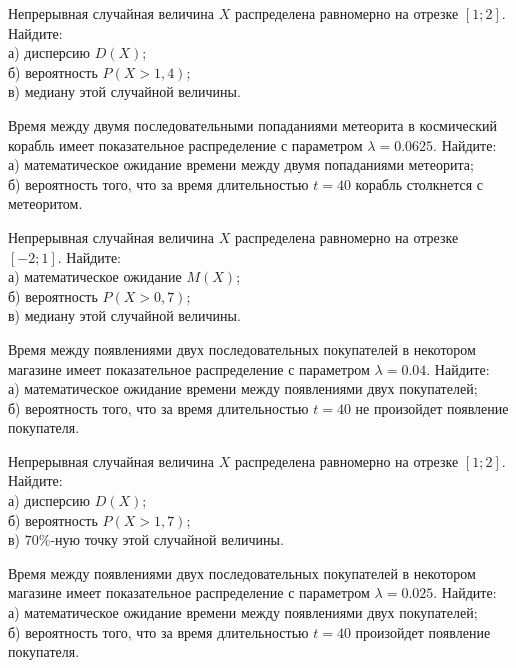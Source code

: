 \vfill

\newpage\setcounter{zad}{0}

\z Непрерывная случайная величина $X$ распределена равномерно на отрезке $[1; 2]$. Найдите: \\ \quad а) дисперсию $D(X)$; \\ \quad б) вероятность $P(X>1{,}4)$; \\ \quad в) медиану этой случайной величины.


\vfill

\z Время между двумя последовательными попаданиями метеорита в космический корабль имеет показательное распределение с параметром $\lambda = 0.0625$. Найдите: \\ \quad а) математическое ожидание времени между двумя попаданиями метеорита; \\ \quad б) вероятность того, что за время длительностью $t = 40$ корабль  столкнется с метеоритом.
 

\vfill

\newpage\setcounter{zad}{0}

\z Непрерывная случайная величина $X$ распределена равномерно на отрезке $[-2; 1]$. Найдите: \\ \quad а) математическое ожидание $M(X)$; \\ \quad б) вероятность $P(X>0{,}7)$; \\ \quad в) медиану этой случайной величины.


\vfill

\z Время между появлениями двух последовательных покупателей в некотором магазине имеет показательное распределение с параметром $\lambda = 0.04$. Найдите: \\ \quad а) математическое ожидание времени между появлениями двух покупателей; \\ \quad б) вероятность того, что за время длительностью $t = 40$ не произойдет появление покупателя.
 

\vfill

\newpage\setcounter{zad}{0}

\z Непрерывная случайная величина $X$ распределена равномерно на отрезке $[1; 2]$. Найдите: \\ \quad а) дисперсию $D(X)$; \\ \quad б) вероятность $P(X>1{,}7)$; \\ \quad в) $70\%$-ную точку этой случайной величины.


\vfill

\z Время между появлениями двух последовательных покупателей в некотором магазине имеет показательное распределение с параметром $\lambda = 0.025$. Найдите: \\ \quad а) математическое ожидание времени между появлениями двух покупателей; \\ \quad б) вероятность того, что за время длительностью $t = 40$  произойдет появление покупателя.
 

